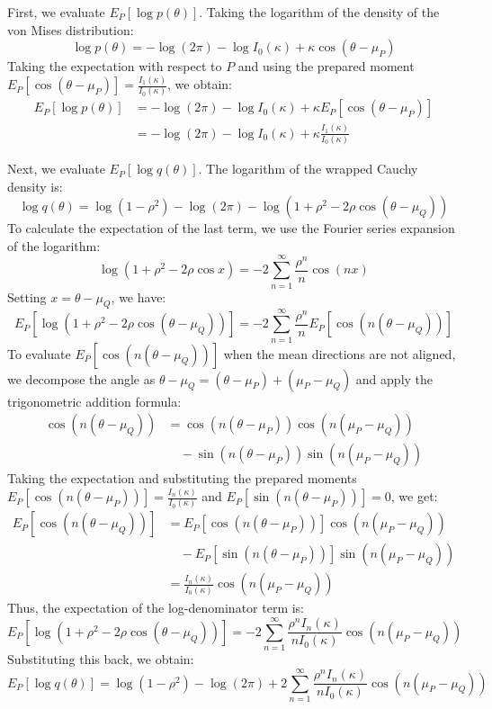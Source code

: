 \documentclass[11pt,a4paper]{article}
\begin{document}
First, we evaluate $E_P[\log p(\theta)]$. Taking the logarithm of the density of the von Mises distribution:
\begin{equation}
\log p(\theta) = -\log(2\pi) - \log I_0(\kappa) + \kappa \cos(\theta - \mu_P)
\end{equation}
Taking the expectation with respect to $P$ and using the prepared moment $E_P[\cos(\theta - \mu_P)] = \frac{I_1(\kappa)}{I_0(\kappa)}$, we obtain:
\begin{align}
E_P[\log p(\theta)] &= -\log(2\pi) - \log I_0(\kappa) + \kappa E_P[\cos(\theta - \mu_P)] \nonumber \\
&= -\log(2\pi) - \log I_0(\kappa) + \kappa \frac{I_1(\kappa)}{I_0(\kappa)}
\end{align}

Next, we evaluate $E_P[\log q(\theta)]$. The logarithm of the wrapped Cauchy density is:
\begin{equation}
\log q(\theta) = \log(1 - \rho^2) - \log(2\pi) - \log(1 + \rho^2 - 2\rho \cos(\theta - \mu_Q))
\end{equation}
To calculate the expectation of the last term, we use the Fourier series expansion of the logarithm:
\begin{equation}
\log(1 + \rho^2 - 2\rho \cos x) = -2 \sum_{n=1}^\infty \frac{\rho^n}{n} \cos(nx)
\end{equation}
Setting $x = \theta - \mu_Q$, we have:
\begin{equation}
E_P[\log(1 + \rho^2 - 2\rho \cos(\theta - \mu_Q))] = -2 \sum_{n=1}^\infty \frac{\rho^n}{n} E_P[\cos(n(\theta - \mu_Q))]
\end{equation}
To evaluate $E_P[\cos(n(\theta - \mu_Q))]$ when the mean directions are not aligned, we decompose the angle as $\theta - \mu_Q = (\theta - \mu_P) + (\mu_P - \mu_Q)$ and apply the trigonometric addition formula:
\begin{align}
\cos(n(\theta - \mu_Q)) &= \cos(n(\theta - \mu_P)) \cos(n(\mu_P - \mu_Q)) \nonumber \\
&\quad - \sin(n(\theta - \mu_P)) \sin(n(\mu_P - \mu_Q))
\end{align}
Taking the expectation and substituting the prepared moments $E_P[\cos(n(\theta - \mu_P))] = \frac{I_n(\kappa)}{I_0(\kappa)}$ and $E_P[\sin(n(\theta - \mu_P))] = 0$, we get:
\begin{align}
E_P[\cos(n(\theta - \mu_Q))] &= E_P[\cos(n(\theta - \mu_P))] \cos(n(\mu_P - \mu_Q)) \nonumber \\
&\quad - E_P[\sin(n(\theta - \mu_P))] \sin(n(\mu_P - \mu_Q)) \nonumber \\
&= \frac{I_n(\kappa)}{I_0(\kappa)} \cos(n(\mu_P - \mu_Q))
\end{align}
Thus, the expectation of the log-denominator term is:
\begin{equation}
E_P[\log(1 + \rho^2 - 2\rho \cos(\theta - \mu_Q))] = -2 \sum_{n=1}^\infty \frac{\rho^n I_n(\kappa)}{n I_0(\kappa)} \cos(n(\mu_P - \mu_Q))
\end{equation}
Substituting this back, we obtain:
\begin{equation}
E_P[\log q(\theta)] = \log(1 - \rho^2) - \log(2\pi) + 2 \sum_{n=1}^\infty \frac{\rho^n I_n(\kappa)}{n I_0(\kappa)} \cos(n(\mu_P - \mu_Q))
\end{equation}
\end{document}
